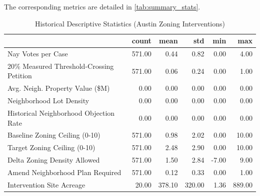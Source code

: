 

The corresponding metrics are detailed in \autoref{tab:summary_stats}.

\begin{table}[h]
\centering
\caption{Historical Descriptive Statistics (Austin Zoning Interventions)}
\label{tab:summary_stats}
\begin{tabular}{lrrrrr}
\toprule
 & count & mean & std & min & max \\
\midrule
Nay Votes per Case & 571.00 & 0.44 & 0.82 & 0.00 & 4.00 \\
20\% Measured Threshold-Crossing Petition & 571.00 & 0.06 & 0.24 & 0.00 & 1.00 \\
Avg. Neigh. Property Value (\$M) & 0.00 & 0.00 & 0.00 & 0.00 & 0.00 \\
Neighborhood Lot Density & 0.00 & 0.00 & 0.00 & 0.00 & 0.00 \\
Historical Neighborhood Objection Rate & 0.00 & 0.00 & 0.00 & 0.00 & 0.00 \\
Baseline Zoning Ceiling (0-10) & 571.00 & 0.98 & 2.02 & 0.00 & 10.00 \\
Target Zoning Ceiling (0-10) & 571.00 & 2.48 & 2.90 & 0.00 & 10.00 \\
Delta Zoning Density Allowed & 571.00 & 1.50 & 2.84 & -7.00 & 9.00 \\
Amend Neighborhood Plan Required & 571.00 & 0.12 & 0.33 & 0.00 & 1.00 \\
Intervention Site Acreage & 20.00 & 378.10 & 320.00 & 1.36 & 889.00 \\
\bottomrule
\end{tabular}
\end{table}
